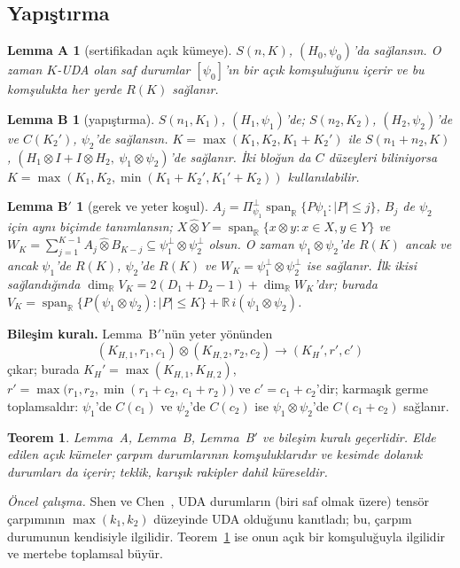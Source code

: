 \documentclass[aps,pra,onecolumn,superscriptaddress,nofootinbib,longbibliography,10pt]{revtex4-2}
\newtheorem{theorem}{Teorem}
\newtheorem*{lemA}{Lemma A}
\newtheorem*{lemB}{Lemma B}
\newtheorem*{lemBp}{Lemma B$'$}
\theoremstyle{definition}
\newcommand{\RR}{\mathbb R}
\newcommand{\spanR}{\operatorname{span}_{\RR}}
\begin{document}
\subsection{Yapıştırma}
\begin{lemA}[sertifikadan açık kümeye]
$S(n,K)$, $(H_0,\psi_0)$'da sağlansın. O zaman $K$-UDA olan saf durumlar $[\psi_0]$'ın bir açık komşuluğunu içerir ve bu komşulukta her yerde $R(K)$ sağlanır.
\end{lemA}
\begin{lemB}[yapıştırma]
$S(n_1,K_1)$, $(H_1,\psi_1)$'de; $S(n_2,K_2)$, $(H_2,\psi_2)$'de ve $C(K_2')$, $\psi_2$'de sağlansın. $K=\max(K_1,K_2,K_1+K_2')$ ile $S(n_1+n_2,K)$, $(H_1\otimes I+I\otimes H_2,\allowbreak\ \psi_1\otimes\psi_2)$'de sağlanır. İki bloğun da $C$ düzeyleri biliniyorsa $K=\max(K_1,K_2,\min(K_1+K_2',K_1'+K_2))$ kullanılabilir.
\end{lemB}
\begin{lemBp}[gerek ve yeter koşul]
$A_j=\Pi^\perp_{\psi_1}\spanR\{P\psi_1:|P|\le j\}$, $B_j$ de $\psi_2$ için aynı biçimde tanımlansın; $X\hat\otimes Y=\spanR\{x\otimes y:x\in X,y\in Y\}$ ve $W_K=\sum_{j=1}^{K-1}A_j\hat\otimes B_{K-j}\subseteq\psi_1^\perp\otimes\psi_2^\perp$ olsun. O zaman $\psi_1\otimes\psi_2$'de $R(K)$ ancak ve ancak $\psi_1$'de $R(K)$, $\psi_2$'de $R(K)$ ve $W_K=\psi_1^\perp\otimes\psi_2^\perp$ ise sağlanır. İlk ikisi sağlandığında $\dim_{\RR}V_K=2(D_1+D_2-1)+\dim_{\RR}W_K$'dır; burada $V_K=\spanR\{P(\psi_1\otimes\psi_2):|P|\le K\}+\RR\,i(\psi_1\otimes\psi_2)$.
\end{lemBp}
\noindent \textbf{Bileşim kuralı.} Lemma~B$'$'nün yeter yönünden
\[
(K_{H,1},r_1,c_1)\otimes(K_{H,2},r_2,c_2)\to(K_H',r',c')
\]
çıkar; burada $K_H'=\max(K_{H,1},K_{H,2})$, $r'=\max\big(r_1,r_2,\min(r_1+c_2,\,c_1+r_2)\big)$ ve $c'=c_1+c_2$'dir; karmaşık germe toplamsaldır: $\psi_1$'de $C(c_1)$ ve $\psi_2$'de $C(c_2)$ ise $\psi_1\otimes\psi_2$'de $C(c_1+c_2)$ sağlanır.

\begin{theorem}\label{thm:glue}
Lemma~A, Lemma~B, Lemma~B$'$ ve bileşim kuralı geçerlidir. Elde edilen açık kümeler çarpım durumlarının komşuluklarıdır ve kesimde dolanık durumları da içerir; teklik, karışık rakipler dahil küreseldir.
\end{theorem}
\noindent \emph{Öncel çalışma.} Shen ve Chen~\cite{SC23}, UDA durumların (biri saf olmak üzere) tensör çarpımının $\max(k_1,k_2)$ düzeyinde UDA olduğunu kanıtladı; bu, çarpım durumunun kendisiyle ilgilidir. Teorem~\ref{thm:glue} ise onun açık bir komşuluğuyla ilgilidir ve mertebe toplamsal büyür.
\end{document}
